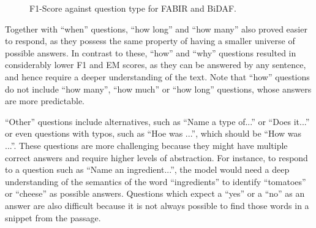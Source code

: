 \documentclass[conference, letterpaper, 10pt]{IEEEtran}
\begin{document}
\begin{figure}[t!]
\clearpage{}
            \caption{F1-Score against question type for FABIR and BiDAF.}
            \label{fig:q_type_stat}
            
        \end{figure}
Together with {``}when{''} questions, {``}how long{''} and {``}how many{''} also proved easier to respond, as they possess the same property of having a smaller universe of possible answers. 
In contrast to these, {``}how{''} and {``}why{''} questions resulted in considerably lower F1 and EM scores, as they can be answered by any sentence, and hence require a deeper understanding of the text. 
Note that {``}how{''} questions do not include {``}how many{''}, {``}how much{''} or {``}how long{''} questions, whose answers are more predictable. 

{``}Other{''} questions include alternatives, such as {``}Name a type of...{''} or {``}Does it...{''} or even questions with typos, such as {``}Hoe was ...{''}, which should be {``}How was ...{''}. These questions are more challenging because they might have multiple correct answers and require higher levels of abstraction.
For instance, to respond to a question such as {``}Name an ingredient...{''}, the model would need a deep understanding of the semantics of the word {``}ingredients{''} to identify  {``}tomatoes{''} or {``}cheese{''} as possible answers.
Questions which expect a {``}yes{''} or a {``}no{''} as an answer are also difficult because it is not always possible to find those words in a snippet from the passage.
\end{document}
